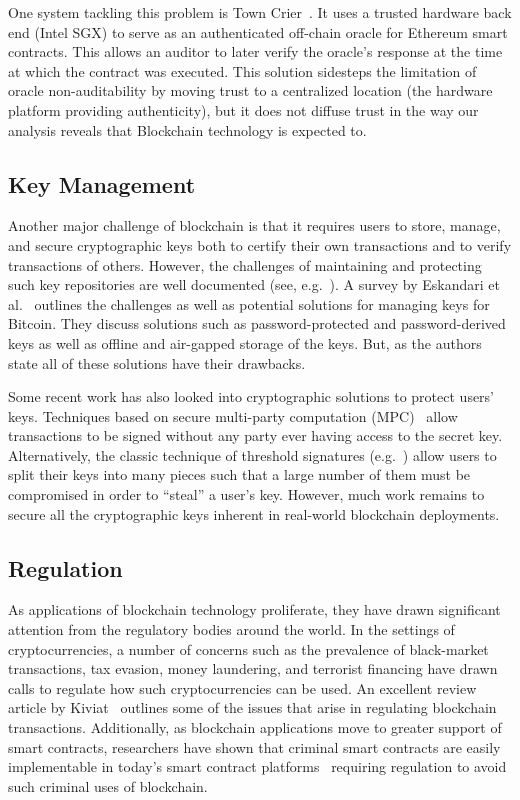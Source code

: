 One system tackling this problem is Town Crier~\cite{Zhang16}. It uses a trusted hardware back end (Intel SGX) to serve as an authenticated off-chain oracle for Ethereum smart contracts. This allows an auditor to later verify the oracle's response at the time at which the contract was executed. This solution sidesteps the limitation of oracle non-auditability by moving trust to a centralized location (the hardware platform providing authenticity), but it does not diffuse trust in the way our analysis reveals that Blockchain technology is expected to.

\subsection{Key Management}
Another major challenge of blockchain is that it requires users to store, manage, and secure cryptographic keys both to certify their own transactions and to verify transactions of others.  However, the challenges of maintaining and protecting such key repositories are well documented (see, e.g.~\cite{uss:WhiTyg99}).  A survey by Eskandari et al.~\cite{arxiv:ECBS18} outlines the challenges as well as potential solutions for managing keys for Bitcoin.  They discuss solutions such as password-protected and password-derived keys as well as offline and air-gapped storage of the keys.  But, as the authors state all of these solutions have their drawbacks.

Some recent work has also looked into cryptographic solutions to protect users' keys.  Techniques based on secure multi-party computation (MPC)~\cite{CCS:LinNof18,C:Lindell17} allow transactions to be signed without any party ever having access to the secret key.  Alternatively, the classic technique of threshold signatures (e.g.~\cite{PKC:Boldyreva03,EC:GJKR96,EC:Shoup00a}) allow users to split their keys into many pieces such that a large number of them must be compromised in order to ``steal'' a user's key.  However, much work remains to secure all the cryptographic keys inherent in real-world blockchain deployments.

\subsection{Regulation}
As applications of blockchain technology proliferate, they have drawn significant attention from the regulatory bodies around the world.  In the settings of cryptocurrencies, a number of concerns such as the prevalence of black-market transactions, tax evasion, money laundering, and terrorist financing have drawn calls to regulate how such cryptocurrencies can be used.  An excellent review article by Kiviat~\cite{Kiviat15} outlines some of the issues that arise in regulating blockchain transactions.  Additionally, as blockchain applications move to greater support of smart contracts, researchers have shown that criminal smart contracts are easily implementable in today's smart contract platforms~\cite{CCS:JueKosShi16} requiring regulation to avoid such criminal uses of blockchain.  

